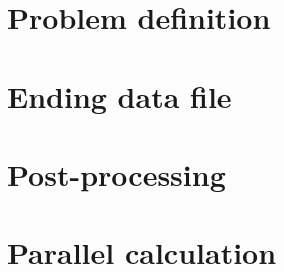 \documentclass[a4paper,11pt,english]{report}
\begin{document}
%
\chapter{Problem definition}
%




%
\chapter{Ending data file}
%




%
\chapter{Post-processing}
%




%
\chapter{Parallel calculation} \label{parallel}
%




\end{document}
